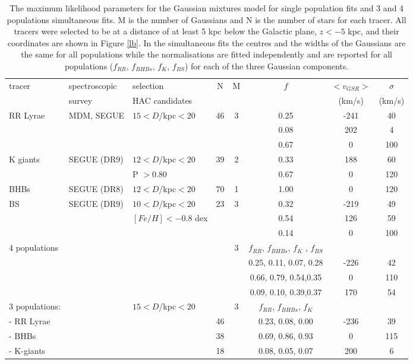 \documentclass[useAMS,usenatbib]{mn2e}
\begin{document}
\begin{table*}
 \centering
 \hspace*{-1.cm}
 \begin{minipage}{160mm}
   \caption[Expectation Maximisation parameters]{The maximum likelihood parameters for the Gaussian mixtures model for single population fits and 3 and 4 populations simultaneous fits. M is the number of Gaussians and N is the number of stars for each tracer. All tracers were selected to be at a distance of at least 5 kpc below the Galactic plane, $z < -5$ kpc, and their coordinates are shown in Figure \ref{lb}. In the simultaneous fits the centres and the widths of the Gaussians are the same for all populations while the normalisations are fitted independently and are reported for all populations ($ f_{RR}$, $f_{BHBs}$, $f_{K}$, $f_{BS}$) for each of the three Gaussian components.}
    \label{EMtable}
         \begin{tabular}{@{}lllccccc@{}}
 \hline
  tracer & spectroscopic & selection & N & M & $f$ &  $<v_{GSR}>$ & $\sigma$   \\
 & survey & HAC candidates &  &  &  &   (km/s) &  (km/s)  \\
 \hline
RR Lyrae & MDM, SEGUE & $15<D$/kpc$<20$ & 46 & 3 & 0.25 & -241 & 40  \\
 & & & &  & 0.08 & 202 & 4  \\
 & & & &  & 0.67 & 0 & 100  \\
  \hline
 K giants & SEGUE (DR9) &  $12<D$/kpc$<20$ & 39 & 2 & 0.33 & 188 & 60  \\
 & &P $> $0.80 &  & & 0.67 & 0 & 120  \\
 \hline
BHBs & SEGUE (DR8) &  $12<D$/kpc$<20$ & 70 & 1 & 1.00 & 0 & 120  \\
 \hline
BS &  SEGUE (DR9) &$10<D$/kpc$<20$ & 23 & 3 & 0.32 & -219 & 49  \\
 & &  $[Fe/H] < -0.8$ dex &  &  & 0.54 & 126 & 59   \\
  & &  &  &  & 0.14 & 0 & 100   \\
   \hline
 4 populations & &  & & 3 &$ f_{RR}$, $f_{BHBs}$, $f_{K}$ , $f_{BS}$ & & \\
 & & & &  & 0.25, 0.11, 0.07, 0.28 & -226 & 42  \\
 & & & &  &  0.66, 0.79, 0.54,0.35 & 0 & 110  \\
 & & & &  & 0.09, 0.10, 0.39,0.37 & 170 & 54  \\
 \hline
 3 populations: & & $15<D$/kpc$<20$ &  & 3 &$ f_{RR}$, $f_{BHBs}$, $f_{K}$ & & \\
- RR Lyrae & & & 46 &  & 0.23, 0.08, 0.00 & -236 & 39  \\
- BHBs & & & 38 &   & 0.69, 0.86, 0.93 & 0 & 115 \\
- K-giants & & & 18 &  & 0.08, 0.05, 0.07 & 200 & 6  \\
  \hline
    \end{tabular}
 \end{minipage}
\end{table*}
%
\end{document}
